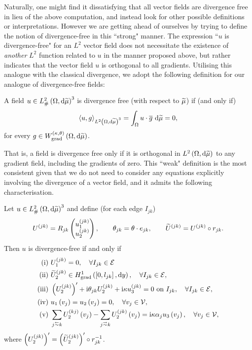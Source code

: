 Naturally, one might find it dissatisfying that all vector fields are divergence free in lieu of the above computation, and instead look for other possible definitions or interpretations.
However we are getting ahead of ourselves by trying to define the notion of divergence-free in this ``strong" manner.
The expression ``$u$ is divergence-free" for an $L^2$ vector field does not necessitate the existence of \emph{another} $L^2$ function related to $u$ in the manner proposed above, but rather indicates that the vector field $u$ is orthogonal to all gradients.
Utilising this analogue with the classical divergence, we adopt the following definition for our analogue of divergence-free fields:
\begin{definition} \label{def:DivFree-AllGradients}
	A field $u\in L^2_{\#}\left( \Omega,\mathrm{d} \widetilde{\mu} \right)^3$ is divergence free (with respect to $\widetilde{\mu}$) if (and only if)
	\begin{align*}
		\left\langle u , g \right\rangle_{L^{2}\left( \Omega,\mathrm{d} \widetilde{\mu} \right)^3} = \int_{\Omega} u\cdot\overline{g}  \ \mathrm{d}\widetilde{\mu} = 0,
	\end{align*}
	for every $g\in W_{\mathrm{grad}}^{\left( \kappa, \theta \right)}\left( \Omega,\mathrm{d}\widetilde{\mu} \right)$.
\end{definition}
That is, a field is divergence free only if it is orthogonal in $L^{2}\left( \Omega,\mathrm{d} \widetilde{\mu} \right)$ to any gradient field, including the gradients of zero.
This ``weak" definition is the most consistent given that we do not need to consider any equations explicitly involving the divergence of a vector field, and it admits the following characterisation.
\begin{prop} \label{prop:DivFree-AllGradsConditions}
	Let $u\in L^2_{\#}\left( \Omega,\mathrm{d} \widetilde{\mu} \right)^3$ and define (for each edge $I_{jk}$)
	\begin{align*}
		U^{(jk)} = R_{jk}\begin{pmatrix} u_1^{(jk)} \\ u_2^{(jk)} \end{pmatrix}, 
		\qquad \theta_{jk} = \theta\cdot e_{jk}, 
		\qquad \widetilde{U}^{(jk)} = U^{(jk)}\circ r_{jk}.
	\end{align*}		
	Then $u$ is divergence-free if and only if
	\begin{align*}
		\mathrm{(i)} \ & U_1^{(jk)} = 0, \quad \forall I_{jk}\in\edgeSet \\
		\mathrm{(ii)} \ & \widetilde{U}_2^{(jk)}\in\gradSob{\sqbracs{0,l_{jk}}}{y}, \quad \forall I_{jk}\in\edgeSet, \\
		\mathrm{(iii)} \ & \bracs{U_2^{(jk)}}' + \rmi\qm_{jk}U_2^{(jk)} + \rmi\wavenumber u_3^{(jk)} = 0 \text{ on } I_{jk}, \quad \forall I_{jk}\in\edgeSet, \\
		\mathrm{(iv)} \ & u_1\bracs{v_j} = u_2\bracs{v_j} = 0, \quad \forall v_j\in\vertSet, \\
		\mathrm{(v)} \ & \sum_{j\conRight k}U_2^{(kj)}\bracs{v_j} - \sum_{j\conLeft k}U_2^{(jk)}\bracs{v_j} = \rmi\wavenumber\alpha_j u_3\bracs{v_j}, \quad \forall v_j\in\vertSet,
	\end{align*}
	where $\left( U_2^{(jk)} \right)' = \left( \widetilde{U}_2^{(jk)} \right)'\circ r_{jk}^{-1}$.
\end{prop}
